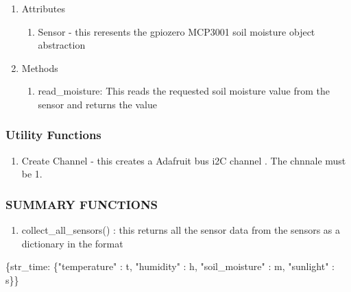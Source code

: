 \documentclass[
]{article}
\newenvironment{Shaded}{}{}
\newcommand{\NormalTok}[1]{#1}
\newcommand{\StringTok}[1]{\textcolor[rgb]{0.25,0.44,0.63}{#1}}
\providecommand{\tightlist}{%
  \setlength{\itemsep}{0pt}\setlength{\parskip}{0pt}}
\begin{document}
\begin{enumerate}
  \begin{enumerate}
  \def\labelenumii{\arabic{enumii}.}
  \tightlist
  \item
    Attributes

    \begin{enumerate}
    \def\labelenumiii{\arabic{enumiii}.}
    \tightlist
    \item
      Sensor - this reresents the gpiozero MCP3001 soil moisture object
      abstraction
    \end{enumerate}
  \item
    Methods

    \begin{enumerate}
    \def\labelenumiii{\arabic{enumiii}.}
    \tightlist
    \item
      read\_moisture: This reads the requested soil moisture value from
      the sensor and returns the value
    \end{enumerate}
  \end{enumerate}
\end{enumerate}

\hypertarget{utility-functions}{%
\subsubsection{Utility Functions}\label{utility-functions}}

\begin{enumerate}
\def\labelenumi{\arabic{enumi}.}
\tightlist
\item
  Create Channel - this creates a Adafruit bus i2C channel . The chnnale
  must be 1.
\end{enumerate}

\hypertarget{summary-functions}{%
\subsubsection{SUMMARY FUNCTIONS}\label{summary-functions}}

\begin{enumerate}
\def\labelenumi{\arabic{enumi}.}
\tightlist
\item
  collect\_all\_sensors() : this returns all the sensor data from the
  sensors as a dictionary in the format
\end{enumerate}

\begin{Shaded}
\begin{Highlighting}[]
\NormalTok{\{str\_time: \{}\StringTok{"temperature"}\NormalTok{ : t, }\StringTok{"humidity"}\NormalTok{ : h, }\StringTok{"soil\_moisture"}\NormalTok{ : m, }\StringTok{"sunlight"}\NormalTok{ : s\}\}}
\end{Highlighting}
\end{Shaded}
\end{document}
